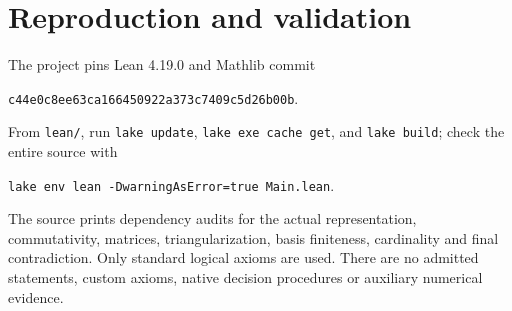 \documentclass[11pt]{article}
\begin{document}
\section*{Reproduction and validation}
The project pins Lean 4.19.0 and Mathlib commit
\begin{center}\small\texttt{c44e0c8ee63ca166450922a373c7409c5d26b00b}.\end{center}
From \texttt{lean/}, run \texttt{lake update}, \texttt{lake exe cache get},
and \texttt{lake build}; check the entire source with
\begin{center}\small\texttt{lake env lean -DwarningAsError=true Main.lean}.\end{center}
The source prints dependency audits for the actual representation,
commutativity, matrices, triangularization, basis finiteness, cardinality
and final contradiction. Only standard logical axioms are used. There are
no admitted statements, custom axioms, native decision procedures or
auxiliary numerical evidence.
\end{document}
